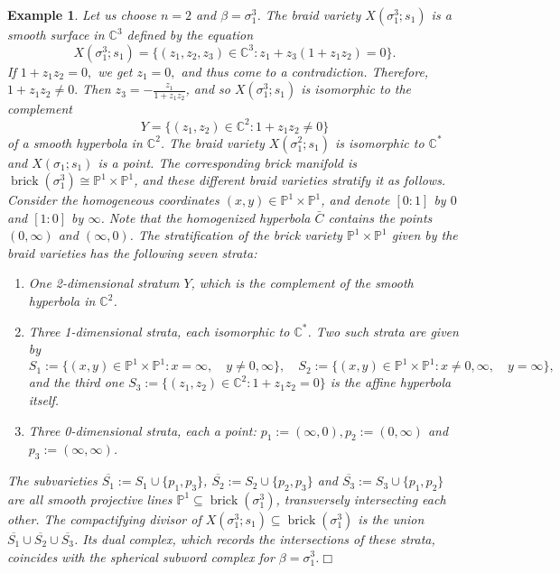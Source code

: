 \documentclass[10pt]{amsart}
\theoremstyle{plain}
\newtheorem{example}[thm]{Example}
\theoremstyle{definition}
\theoremstyle{remark}
\numberwithin{equation}{section}
\newcommand{\PP}{\mathbb{P}}
\renewcommand{\P}{\mathbb{P}}
\newcommand{\sse}{\subseteq}
\newcommand{\bC}{\mathbb{C}}
\newcommand{\brick}{\operatorname{brick}}
\newcommand{\s}{\sigma}
\begin{document}
\begin{example} Let us choose $n=2$ and $\beta=\s_1^3$. The braid variety $X(\s_1^3;s_1)$ is a smooth surface in $\bC^3$ defined by the equation
$$X(\s_1^3;s_1) = \{(z_1,z_2,z_3)\in\bC^3: z_1 + z_3(1 + z_1 z_2) = 0\}.$$
If $1 + z_1 z_2 = 0,$ we get $z_1 = 0,$ and thus come to a contradiction. Therefore, $1 + z_1 z_2 \neq 0.$ Then $z_3 = - \frac{z_1}{1 + z_1 z_2}$, and so $X(\s_1^3;s_1)$ is isomorphic to the complement
$$Y = \{(z_1, z_2)\in\bC^2:1 + z_1 z_2 \neq 0\}$$
of a smooth hyperbola in $\bC^2$. The braid variety $X(\s_1^2;s_1)$ is isomorphic to $\bC^*$ and $X(\s_1;s_1)$ is a point. The corresponding brick manifold is $\brick(\s_1^3)\cong\PP^1\times \PP^1$, and these different braid varieties stratify it as follows. Consider the homogeneous coordinates $(x,y)\in\PP^1\times\PP^1$, and denote $[0:1]$ by $0$ and $[1:0]$ by $\infty$. Note that the homogenized hyperbola $\bar{C}$ contains the
points $(0,\infty)$ and $(\infty,0)$. The stratification of the brick variety $\PP^1\times \PP^1$ given by the braid varieties has the following seven strata:
	
	\begin{enumerate}
		\item[-] One 2-dimensional stratum $Y$, which is the complement of the smooth hyperbola in $\bC^2$.\\
		
		\item[-] Three 1-dimensional strata, each isomorphic to $\bC^*$. Two such strata are given by
		$$S_1:=\{(x,y)\in\PP^1\times \PP^1: x=\infty,\quad y\neq 0,\infty\},\quad S_2:=\{(x,y)\in\PP^1\times \PP^1: x\neq0,\infty,\quad y=\infty\},$$
		and the third one $S_3:=\{(z_1, z_2)\in\bC^2:1 + z_1 z_2 = 0\}$ is the affine hyperbola itself.\\
		
		\item[-] Three 0-dimensional strata, each a point: $p_1:=(\infty,0),p_2:=(0,\infty)$ and $p_3:=(\infty,\infty)$.
	\end{enumerate}

 \noindent The subvarieties $\overline{S_1}:=S_1\cup \{p_1,p_3\}$, $\overline{S_2}:=S_2\cup \{p_2,p_3\}$ and $\overline{S_3}:=S_3\cup \{p_1,p_2\}$ are all smooth projective lines $\P^1\sse \brick(\s_1^3)$, transversely intersecting each other. The compactifying divisor of $X(\s_1^3;s_1)\sse\brick(\s_1^3)$ is the union $\overline{S_1}\cup\overline{S_2}\cup \overline{S_3}$. Its dual complex, which records the  intersections of these strata, coincides with the spherical subword complex for $\beta=\s_1^3$.\hfill$\Box$
\end{example}
\end{document}
